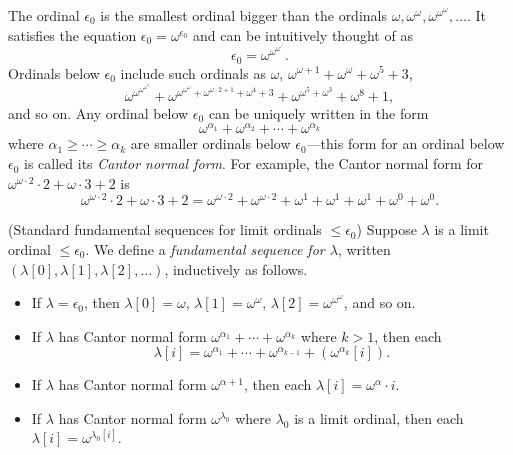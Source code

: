 \documentclass[twoside,11pt]{article}
\begin{document}
The ordinal $\epsilon_0$ is the smallest ordinal bigger than the ordinals
$\omega,\omega^\omega,\omega^{\omega^\omega},\ldots$. It satisfies the equation
$\epsilon_0=\omega^{\epsilon_0}$ and can be intuitively thought of as
\[
    \epsilon_0 = \omega^{\omega^{\omega^{\iddots}}}.
\]
Ordinals below $\epsilon_0$ include such ordinals as $\omega$,
$\omega^{\omega+1}+\omega^{\omega}+\omega^5+3$,
\[
\omega^{\omega^{\omega^{\omega^\omega}}}+
\omega^{\omega^{\omega^\omega}+\omega^{\omega\cdot 2+1}+\omega^4 + 3}
+ \omega^{\omega^5+\omega^3}+\omega^8+1,
\]
and so on.
Any ordinal below $\epsilon_0$ can be uniquely written in the form
\[
    \omega^{\alpha_1}+\omega^{\alpha_2}+\cdots + \omega^{\alpha_k}
\]
where $\alpha_1\geq\cdots\geq\alpha_k$ are smaller ordinals below $\epsilon_0$---this form
for an ordinal below $\epsilon_0$ is called its \emph{Cantor normal form}.
For example, the Cantor normal form for $\omega^{\omega\cdot 2}\cdot 2+\omega\cdot 3+2$
is
\[
\omega^{\omega\cdot 2}\cdot 2+\omega\cdot 3+2
=
\omega^{\omega\cdot 2} + \omega^{\omega\cdot 2} + \omega^1 + \omega^1 + \omega^1
+\omega^0 + \omega^0.
\]

\begin{definition}
\label{fundsequencesdefn}
    (Standard fundamental sequences for limit ordinals $\leq\epsilon_0$)
    Suppose $\lambda$ is a limit ordinal $\leq\epsilon_0$. We define a
    \emph{fundamental sequence for $\lambda$},
    written $(\lambda[0],\lambda[1],\lambda[2],\ldots)$, inductively as follows.
    \begin{itemize}
        \item
        If $\lambda=\epsilon_0$, then $\lambda[0]=\omega$,
        $\lambda[1]=\omega^\omega$, $\lambda[2]=\omega^{\omega^\omega}$,
        and so on.
        \item
        If $\lambda$ has Cantor normal form
        $\omega^{\alpha_1}+\cdots+\omega^{\alpha_k}$ where $k>1$,
        then
        each
        \[
            \lambda[i] = \omega^{\alpha_1}+\cdots+\omega^{\alpha_{k-1}}
            + (\omega^{\alpha_k}[i]).
        \]
        \item
        If $\lambda$ has Cantor normal form $\omega^{\alpha+1}$,
        then each $\lambda[i]=\omega^{\alpha}\cdot i$.
        \item
        If $\lambda$ has Cantor normal form $\omega^{\lambda_0}$ where $\lambda_0$
        is a limit ordinal, then each $\lambda[i]=\omega^{\lambda_0[i]}$.
    \end{itemize}
\end{definition}
\end{document}
